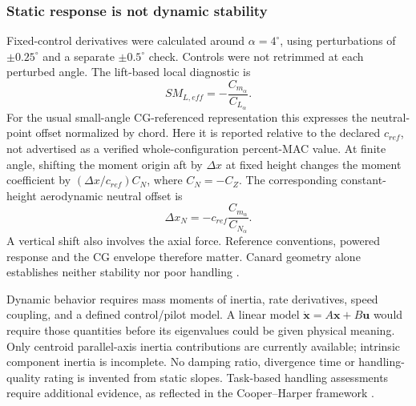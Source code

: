 \documentclass[11pt,a4paper]{article}
\begin{document}
\subsubsection{Static response is not dynamic stability}
Fixed-control derivatives were calculated around $\alpha=4^\circ$, using perturbations of $\pm0.25^\circ$ and a separate $\pm0.5^\circ$ check. Controls were not retrimmed at each perturbed angle. The lift-based local diagnostic is
\begin{equation}
SM_{L,eff}=-\frac{C_{m_\alpha}}{C_{L_\alpha}}.
\label{eq:sm}
\end{equation}
For the usual small-angle CG-referenced representation this expresses the neutral-point offset normalized by chord. Here it is reported relative to the declared $c_{ref}$, not advertised as a verified whole-configuration percent-MAC value. At finite angle, shifting the moment origin aft by $\Delta x$ at fixed height changes the moment coefficient by $(\Delta x/c_{ref})C_N$, where $C_N=-C_Z$. The corresponding constant-height aerodynamic neutral offset is
\begin{equation}
\Delta x_N=-c_{ref}\frac{C_{m_\alpha}}{C_{N_\alpha}}.
\label{eq:neutral}
\end{equation}
A vertical shift also involves the axial force. Reference conventions, powered response and the CG envelope therefore matter. Canard geometry alone establishes neither stability nor poor handling \cite{ref15}.

Dynamic behavior requires mass moments of inertia, rate derivatives, speed coupling, and a defined control/pilot model. A linear model $\dot{\boldsymbol x}=A\boldsymbol x+B\boldsymbol u$ would require those quantities before its eigenvalues could be given physical meaning. Only centroid parallel-axis inertia contributions are currently available; intrinsic component inertia is incomplete. No damping ratio, divergence time or handling-quality rating is invented from static slopes. Task-based handling assessments require additional evidence, as reflected in the Cooper--Harper framework \cite{ref23}.
\end{document}
